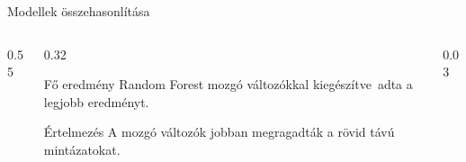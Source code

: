 \documentclass[aspectratio=169,11pt]{beamer}
\begin{document}
\begin{frame}{Modellek összehasonlítása}
\begin{columns}[T, onlytextwidth]
\begin{column}{0.55\textwidth}
  \end{column}

  \hfill

  \begin{column}{0.32\textwidth}

    \vspace{0.1cm}

    \begin{block}{Fő eredmény}
    \small
    \centering
    Random Forest mozgó változókkal kiegészítve\
    adta a legjobb eredményt.
    \end{block}

    \vspace{0.9cm}

    \begin{block}{Értelmezés}
    \small
    \centering
    A mozgó változók jobban megragadták a rövid távú mintázatokat.
    \end{block}

  \end{column}

  \begin{column}{0.03\textwidth}
  \end{column}

\end{columns}

\end{frame}
\end{document}
